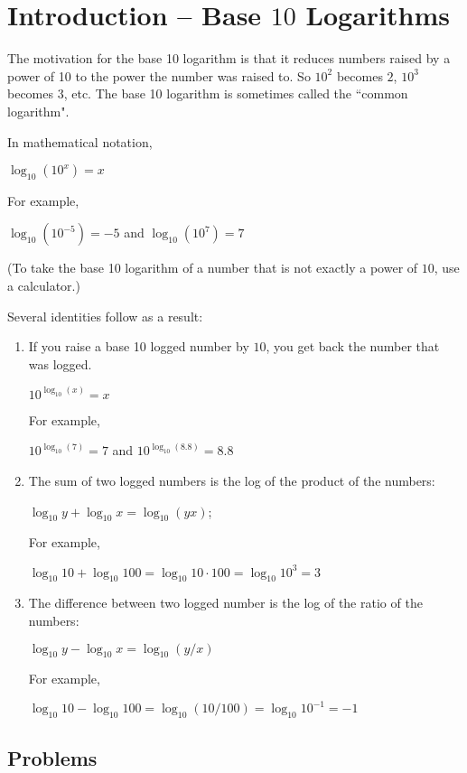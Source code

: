 \documentclass{article}
\begin{document}
\section{Introduction -- Base $10$ Logarithms}

The motivation for the base 10 logarithm is that it reduces numbers raised by a power of 10 to the power the number was raised to. So $10^2$ becomes $2$, $10^3$ becomes $3$, etc. The base 10 logarithm is sometimes called the ``common logarithm".

In mathematical notation,

$\log_{10}(10^x) = x$

For example,

$\log_{10}(10^{-5}) = -5$ and $\log_{10}(10^7) = 7$

(To take the base 10 logarithm of a number that is not exactly a power of $10$, use a calculator.)

Several identities follow as a result:

\begin{enumerate}

  \item If you raise a base 10 logged number by $10$, you get back the number that was logged.

        $10^{\log_{10}(x)} = x$

        For example,

        $10^{\log_{10}(7)} = 7$ and  $10^{\log_{10}(8.8)} = 8.8$

  \item The sum of two logged numbers is the log of the product of the numbers:

        $\log_{10}y + \log_{10}x = \log_{10}(yx)$;

        For example,

        $\log_{10}10 + \log_{10}100 = \log_{10}10\cdot 100 = \log_{10}10^3 = 3$

  \item The difference between two logged number is the log of the ratio of the numbers:

        $\log_{10}y - \log_{10}x = \log_{10}(y/x)$

        For example,

        $\log_{10}10 - \log_{10}100 = \log_{10}(10/100) = \log_{10}10^{-1} = -1$

\end{enumerate}

\subsection{Problems}
\end{document}
